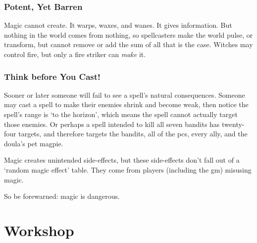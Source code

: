 \begin{multicols}{2}
\subsubsection{Potent, Yet Barren}

Magic cannot create.
It warps, waxes, and wanes.
It gives information.
But nothing in the world comes from nothing, so spellcasters make the world pulse, or transform, but cannot remove or add the sum of all that is the case.
Witches may control fire, but only a fire striker can \textit{make} it.

\subsubsection{Think before You Cast!}

Sooner or later someone will fail to see a spell's natural consequences.
Someone may cast a spell to make their enemies shrink and become weak, then notice the spell's range is `to the horizon', which means the spell cannot actually target those enemies.
Or perhaps a spell intended to kill all seven bandits has twenty-four targets, and therefore targets the bandits, all of the \glspl{pc}, every ally, and the \gls{doula}'s pet magpie.

Magic creates unintended side-effects, but these side-effects don't fall out of a `random magic effect' table.
They come from players (including the \gls{gm}) misusing magic.

So be forewarned: magic is dangerous.

\end{multicols}

\section{ Workshop}

